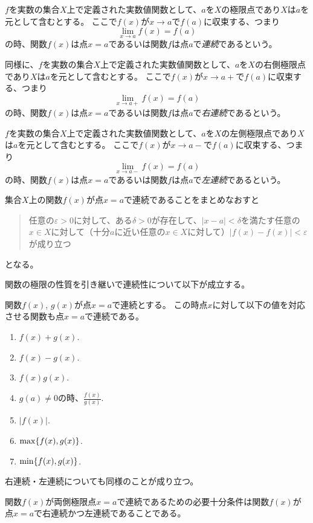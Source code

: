 \begin{definition}[連続性]
$f$を実数の集合$X$上で定義された実数値関数として、$a$を$X$の極限点であり$X$は$a$を元として含むとする。
ここで$f(x)$が$x \to a$で$f(a)$に収束する、つまり
$$
\lim_{x \to a}f(x) = f(a)
$$
の時、関数$f(x)$は点$x = a$であるいは関数$f$は点$a$で\emph{連続}であるという。

同様に、$f$を実数の集合$X$上で定義された実数値関数として、$a$を$X$の右側極限点であり$X$は$a$を元として含むとする。
ここで$f(x)$が$x \to a+$で$f(a)$に収束する、つまり
$$
\lim_{x \to a+}f(x) = f(a)
$$
の時、関数$f(x)$は点$x = a$であるいは関数$f$は点$a$で\emph{右連続}であるという。

$f$を実数の集合$X$上で定義された実数値関数として、$a$を$X$の左側極限点であり$X$は$a$を元として含むとする。
ここで$f(x)$が$x \to a-$で$f(a)$に収束する、つまり
$$
\lim_{x \to a-}f(x) = f(a)
$$
の時、関数$f(x)$は点$x = a$であるいは関数$f$は点$a$で\emph{左連続}であるという。
\end{definition}

\begin{remark}
集合$X$上の関数$f(x)$が点$x = a$で連続であることをまとめなおすと
\begin{quote}
任意の$\varepsilon > 0$に対して、ある$\delta > 0$が存在して、$|x-a| < \delta$を満たす任意の$x \in X$に対して（十分$a$に近い任意の$x \in X$に対して）$|f(x)-f(x)| < \varepsilon$が成り立つ
\end{quote}
となる。
\end{remark}

関数の極限の性質を引き継いで連続性について以下が成立する。

\begin{proposition}[連続と演算]
関数$f(x)$, $g(x)$が点$x = a$で連続とする。
この時点$x$に対して以下の値を対応させる関数も点$x = a$で連続である。
\begin{enumerate}
\item
$f(x)+g(x)$.
\item
$f(x)-g(x)$.
\item
$f(x)g(x)$.
\item
$g(a) \ne 0$の時、$\frac{f(x)}{g(x)}$.
\item
$|f(x)|$.
\item
$\max\{ f(x), g(x) \}$.
\item
$\min\{ f(x), g(x) \}$.
\end{enumerate}
右連続・左連続についても同様のことが成り立つ。
\end{proposition}

\begin{proposition}
関数$f(x)$が両側極限点$x = a$で連続であるための必要十分条件は関数$f(x)$が点$x = a$で右連続かつ左連続であることである。
\end{proposition}

